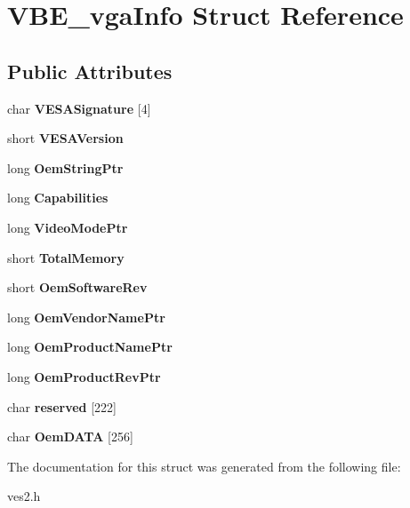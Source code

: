 \section{V\-B\-E\-\_\-vga\-Info Struct Reference}
\label{structVBE__vgaInfo}
\subsection*{Public Attributes}
\begin{DoxyCompactItemize}
\item 
char {\bfseries V\-E\-S\-A\-Signature} [4]\label{structVBE__vgaInfo_adaaf95accc0d3b566a329c5069b4126d}

\item 
short {\bfseries V\-E\-S\-A\-Version}\label{structVBE__vgaInfo_a828d497f314c9e06dd6829d4d5edee00}

\item 
long {\bfseries Oem\-String\-Ptr}\label{structVBE__vgaInfo_a2aaad11da168cc9f0a2f0d8fbd43428b}

\item 
long {\bfseries Capabilities}\label{structVBE__vgaInfo_aca4ebb0c2ae6147b16bcb74431913ac7}

\item 
long {\bfseries Video\-Mode\-Ptr}\label{structVBE__vgaInfo_a4fc11b05872f40f6662885db15a6a9c7}

\item 
short {\bfseries Total\-Memory}\label{structVBE__vgaInfo_aefaf2330b142affd011370f0fe8fdb4c}

\item 
short {\bfseries Oem\-Software\-Rev}\label{structVBE__vgaInfo_ad459fbfcd606dbce8b68bc07ce892375}

\item 
long {\bfseries Oem\-Vendor\-Name\-Ptr}\label{structVBE__vgaInfo_aa4c6667b49656b011005605dc400f510}

\item 
long {\bfseries Oem\-Product\-Name\-Ptr}\label{structVBE__vgaInfo_af561042c17304e1a675d0c9892aa65c1}

\item 
long {\bfseries Oem\-Product\-Rev\-Ptr}\label{structVBE__vgaInfo_a24803a9ab382f0b5984d67ab29314c83}

\item 
char {\bfseries reserved} [222]\label{structVBE__vgaInfo_a244a91b5fa5a8e7bc776ebe3eaf656ed}

\item 
char {\bfseries Oem\-D\-A\-T\-A} [256]\label{structVBE__vgaInfo_a474c47ddb6c2a292f1a0cafa0c489228}

\end{DoxyCompactItemize}


The documentation for this struct was generated from the following file\-:\begin{DoxyCompactItemize}
\item 
ves2.\-h\end{DoxyCompactItemize}
